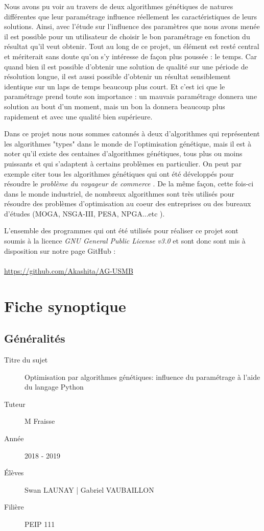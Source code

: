 \documentclass[12pt]{report}
\begin{document}
  Nous avons pu voir au travers de deux algorithmes génétiques de natures différentes que leur paramétrage influence réellement les caractéristiques de leurs solutions. Ainsi, avec l'étude sur l'influence des paramètres que nous avons menée il est possible pour un utilisateur de choisir le bon paramétrage en fonction du résultat qu'il veut obtenir.
  Tout au long de ce projet, un élément est resté central et mériterait sans doute qu'on s'y intéresse de façon plus poussée : le temps. Car quand bien il est possible d'obtenir une solution de qualité sur une période de résolution longue, il est aussi possible d'obtenir un résultat sensiblement identique sur un laps de temps beaucoup plus court. Et c'est ici que le paramétrage prend toute son importance : un mauvais paramétrage donnera une solution au bout d'un moment, mais un bon la donnera beaucoup plus rapidement et avec une qualité bien supérieure.

  Dans ce projet nous nous sommes catonnés à deux d'algorithmes qui représentent les algorithmes "types" dans le monde de l'optimisation génétique, mais il est à noter qu'il existe des centaines d'algorithmes génétiques, tous plus ou moins puissants et qui s'adaptent à certains problèmes en particulier. On peut par exemple citer tous les algorithmes génétiques qui ont été développés pour résoudre le \emph{problème du voyageur de commerce \cite{wiki7}}. De la même façon, cette fois-ci dans le monde industriel, de nombreux algorithmes sont très utilisés pour résoudre des problèmes d'optimisation au coeur des entreprises ou des bureaux d'études (MOGA, NSGA-III, PESA, NPGA...etc \cite{diapo}).


  \vfill
   L'ensemble des programmes qui ont été utilisés pour réaliser ce projet sont soumis à la licence \emph{GNU General Public License v3.0} et sont donc sont mis à disposition sur notre page GitHub : \\\\
   \url{https://github.com/Akashita/AG-USMB}

  \appendix

  \chapter{Fiche synoptique}

  \section{Généralités}
  \begin{description}
    \item[Titre du sujet] Optimisation par algorithmes génétiques: influence du paramétrage à l’aide du langage Python
    \item[Tuteur] M Fraisse
    \item[Année] 2018 - 2019
    \item[Élèves] Swan LAUNAY | Gabriel VAUBAILLON
    \item[Filière] PEIP 111
  \end{description}
\end{document}

